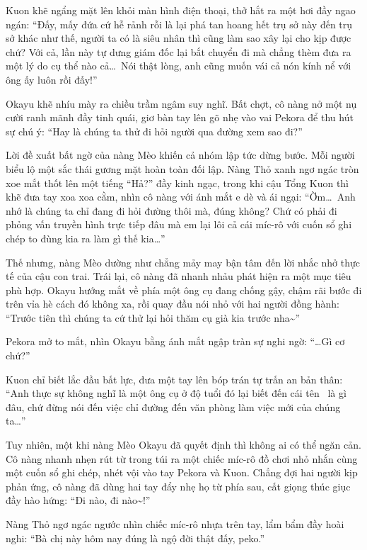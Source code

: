 \documentclass[../main.tex]{subfiles}
\begin{document}
Kuon khẽ ngẩng mặt lên khỏi màn hình điện thoại, thở hắt ra một hơi đầy ngao ngán: ``Đấy, mấy đứa cứ hễ rảnh rỗi là lại phá tan hoang hết trụ sở này đến trụ sở khác như thế, người ta có là siêu nhân thì cũng làm sao xây lại cho kịp được chứ? Với cả, lần này tự dưng giám đốc lại bắt chuyển đi mà chẳng thèm đưa ra một lý do cụ thể nào cả\dots\ Nói thật lòng, anh cũng muốn vái cả nón kính nể với ông ấy luôn rồi đấy!''

Okayu khẽ nhíu mày ra chiều trầm ngâm suy nghĩ. Bất chợt, cô nàng nở một nụ cười ranh mãnh đầy tinh quái, giơ bàn tay lên gõ nhẹ vào vai Pekora để thu hút sự chú ý: ``Hay là chúng ta thử đi hỏi người qua đường xem sao đi?''

Lời đề xuất bất ngờ của nàng Mèo khiến cả nhóm lập tức dừng bước. Mỗi người biểu lộ một sắc thái gương mặt hoàn toàn đối lập. Nàng Thỏ xanh ngơ ngác tròn xoe mắt thốt lên một tiếng ``Hả?'' đầy kinh ngạc, trong khi cậu Tổng Kuon thì khẽ đưa tay xoa xoa cằm, nhìn cô nàng với ánh mắt e dè và ái ngại: ``Ờm\dots\ Anh nhớ là chúng ta chỉ đang đi hỏi đường thôi mà, đúng không? Chứ có phải đi phỏng vấn truyền hình trực tiếp đâu mà em lại lôi cả cái míc-rô với cuốn sổ ghi chép to đùng kia ra làm gì thế kia\dots''

Thế nhưng, nàng Mèo dường như chẳng mảy may bận tâm đến lời nhắc nhở thực tế của cậu con trai. Trái lại, cô nàng đã nhanh nhảu phát hiện ra một mục tiêu phù hợp. Okayu hướng mắt về phía một ông cụ đang chống gậy, chậm rãi bước đi trên vỉa hè cách đó không xa, rồi quay đầu nói nhỏ với hai người đồng hành: ``Trước tiên thì chúng ta cứ thử lại hỏi thăm cụ già kia trước nha\~{}''


Pekora mở to mắt, nhìn Okayu bằng ánh mắt ngập tràn sự nghi ngờ: ``\dots Gì cơ chứ?''

Kuon chỉ biết lắc đầu bất lực, đưa một tay lên bóp trán tự trấn an bản thân: ``Anh thực sự không nghĩ là một ông cụ ở độ tuổi đó lại biết đến cái tên \hll\ là gì đâu, chứ đừng nói đến việc chỉ đường đến văn phòng làm việc mới của chúng ta\dots''

Tuy nhiên, một khi nàng Mèo Okayu đã quyết định thì không ai có thể ngăn cản. Cô nàng nhanh nhẹn rút từ trong túi ra một chiếc míc-rô đồ chơi nhỏ nhắn cùng một cuốn sổ ghi chép, nhét vội vào tay Pekora và Kuon. Chẳng đợi hai người kịp phản ứng, cô nàng đã dùng hai tay đẩy nhẹ họ từ phía sau, cất giọng thúc giục đầy hào hứng: ``Đi nào, đi nào\~{}!''

Nàng Thỏ ngơ ngác ngước nhìn chiếc míc-rô nhựa trên tay, lẩm bẩm đầy hoài nghi: ``Bà chị này hôm nay đúng là ngộ đời thật đấy, peko.''
\end{document}
